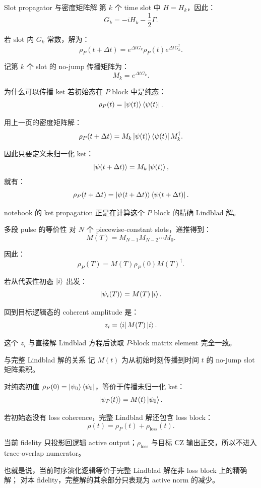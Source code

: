 \documentclass[aspectratio=169,11pt]{ctexbeamer}
\begin{document}
\begin{frame}{Slot propagator 与密度矩阵解}
  第 \(k\) 个 time slot 中 \(H=H_k\)，因此：
  \[
  G_k=-iH_k-\frac12\Gamma.
  \]

  若 slot 内 \(G_k\) 常数，解为：
  \[
  \rho_P(t+\Delta t)
  =
  e^{\Delta t G_k}\rho_P(t)e^{\Delta t G_k^\dagger}.
  \]

  记第 \(k\) 个 slot 的 no-jump 传播矩阵为：
  \[
  M_k=e^{\Delta t G_k}.
  \]
\end{frame}

\begin{frame}{为什么可以传播 ket}
  若初始态在 \(P\) block 中是纯态：
  \[
  \rho_P(t)=\ket{\psi(t)}\bra{\psi(t)}.
  \]

  用上一页的密度矩阵解：
  \[
  \rho_P(t+\Delta t)
  =
  M_k\ket{\psi(t)}\bra{\psi(t)}M_k^\dagger.
  \]

  因此只要定义未归一化 ket：
  \[
  \ket{\psi(t+\Delta t)}=M_k\ket{\psi(t)},
  \]
  就有：
  \[
  \rho_P(t+\Delta t)=\ket{\psi(t+\Delta t)}\bra{\psi(t+\Delta t)}.
  \]

  notebook 的 ket propagation 正是在计算这个 \(P\) block 的精确 Lindblad 解。
\end{frame}

\begin{frame}{多段 pulse 的等价性}
  对 \(N\) 个 piecewise-constant slots，递推得到：
  \[
  M(T)=M_{N-1}M_{N-2}\cdots M_0.
  \]

  因此：
  \[
  \rho_P(T)=M(T)\rho_P(0)M(T)^\dagger.
  \]

  若从代表性初态 \(\ket{i}\) 出发：
  \[
  \ket{\psi_i(T)}=M(T)\ket{i}.
  \]

  回到目标逻辑态的 coherent amplitude 是：
  \[
  z_i=\bra{i}M(T)\ket{i}.
  \]

  这个 \(z_i\) 与直接解 Lindblad 方程后读取
  \(P\)-block matrix element 完全一致。
\end{frame}

\begin{frame}{与完整 Lindblad 解的关系}
  记 \(M(t)\) 为从初始时刻传播到时间 \(t\) 的 no-jump slot 矩阵乘积。

  对纯态初值 \(\rho_P(0)=\ket{\psi_0}\bra{\psi_0}\)，等价于传播未归一化 ket：
  \[
  \ket{\psi_P(t)}=M(t)\ket{\psi_0}.
  \]

  若初始态没有 loss coherence，完整 Lindblad 解还包含 loss block：
  \[
  \rho(t)=\rho_P(t)+\rho_{\mathrm{loss}}(t).
  \]

  当前 fidelity 只投影回逻辑 active output；\(\rho_{\mathrm{loss}}\) 与目标
  CZ 输出正交，所以不进入 trace-overlap numerator。

  也就是说，当前时序演化逻辑等价于完整 Lindblad 解在非 loss block 上的精确解；
  对本 fidelity，完整解的其余部分只表现为 active norm 的减少。
\end{frame}
\end{document}
